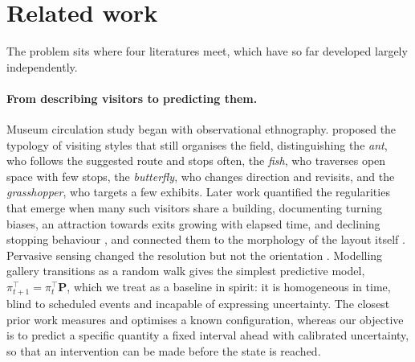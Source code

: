 \documentclass[utf8]{FrontiersinHarvard}
\theoremstyle{plain}
\theoremstyle{definition}
\theoremstyle{remark}
\begin{document}
\section{Related work}
\label{sec:related}

The problem sits where four literatures meet, which have so far developed largely independently.

\paragraph{From describing visitors to predicting them.}
Museum circulation study began with observational ethnography. \citet{veron1983} proposed the typology of visiting styles that still organises the field, distinguishing the \emph{ant}, who follows the suggested route and stops often, the \emph{fish}, who traverses open space with few stops, the \emph{butterfly}, who changes direction and revisits, and the \emph{grasshopper}, who targets a few exhibits. Later work quantified the regularities that emerge when many such visitors share a building, documenting turning biases, an attraction towards exits growing with elapsed time, and declining stopping behaviour \citep{klein1993,bitgood2006}, and connected them to the morphology of the layout itself \citep{choi1999}. Pervasive sensing changed the resolution but not the orientation \citep{kanda2007,yoshimura2014louvre,uwbmuseum2026}. Modelling gallery transitions as a random walk \citep{yoshimura2019randomwalk} gives the simplest predictive model, $\pi_{t+1}^{\top} = \pi_t^{\top}\bm{P}$, which we treat as a baseline in spirit: it is homogeneous in time, blind to scheduled events and incapable of expressing uncertainty. The closest prior work \citep{centorrino2021museums} measures and optimises a known configuration, whereas our objective is to predict a specific quantity a fixed interval ahead with calibrated uncertainty, so that an intervention can be made before the state is reached.
\end{document}
